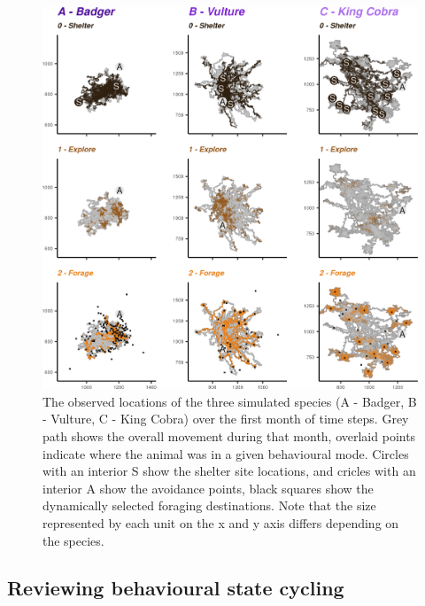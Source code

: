 \documentclass[10pt,a4paper]{article}
\begin{document}
\begin{figure}

{\centering \includegraphics{Agent-based_model_walkthrough_files/figure-latex/oneMonthMapFigure-1} 

}

\caption{The observed locations of the three simulated species (A - Badger, B - Vulture, C - King Cobra) over the first month of time steps. Grey path shows the overall movement during that month, overlaid points indicate where the animal was in a given behavioural mode. Circles with an interior S show the shelter site locations, and cricles with an interior A show the avoidance points, black squares show the dynamically selected foraging destinations. Note that the size represented by each unit on the x and y axis differs depending on the species.}\label{fig:oneMonthMapFigure}
\end{figure}

\hypertarget{reviewing-behavioural-state-cycling}{%
\subsection{Reviewing behavioural state cycling}\label{reviewing-behavioural-state-cycling}}
\end{document}
